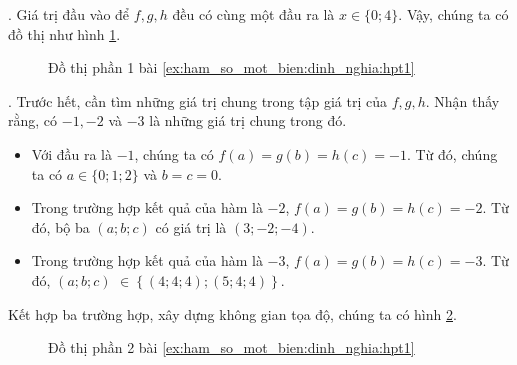 
\setcounter{subexercise}{1}
. Giá trị đầu vào để $f, g, h$ đều có cùng một đầu ra là $x\in\{0;4\}$. Vậy, chúng ta có đồ thị như hình \ref{fig:hpt11}.

\begin{figure}[H]
   \centering
   \caption{Đồ thị phần 1 bài \ref{ex:ham_so_mot_bien:dinh_nghia:hpt1}}
   \label{fig:hpt11}
\end{figure}

. Trước hết, cần tìm những giá trị chung trong tập giá trị của $f, g, h$. Nhận thấy rằng, có $-1, -2$ và $-3$ là những giá trị chung trong đó. 
\begin{itemize}
   \item Với đầu ra là $-1$, chúng ta có $f(a) = g(b) = h(c) = -1$. Từ đó, chúng ta có $a \in \{0; 1; 2\}$ và $b = c = 0$.
   \item Trong trường hợp kết quả của hàm là $-2$, $f(a) = g(b) = h(c) = -2$. Từ đó, bộ ba $\left(a; b; c\right)$ có giá trị là $(3; -2; -4)$.
   \item Trong trường hợp kết quả của hàm là $-3$, $f(a) = g(b) = h(c) = -3$. Từ đó, $\left(a; b; c\right)$ $\in \left\{\left(4; 4; 4\right); \left(5; 4; 4\right)\right\}$.
\end{itemize}
Kết hợp ba trường hợp, xây dựng không gian tọa độ, chúng ta có hình \ref{fig:hpt12}.

\begin{figure}[H]
   \centering
   \caption{Đồ thị phần 2 bài \ref{ex:ham_so_mot_bien:dinh_nghia:hpt1}}
   \label{fig:hpt12}
\end{figure}

